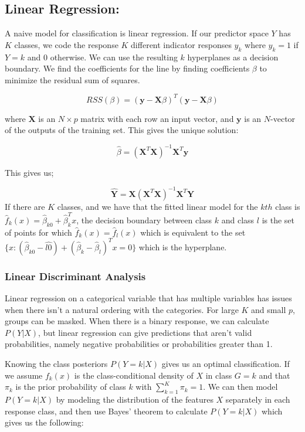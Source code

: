\documentclass[12pt,twoside]{reedthesis}
\theoremstyle{definition}
\theoremstyle{definition}
\theoremstyle{definition}
\theoremstyle{remark}
\begin{document}
\subsection{Linear Regression:}\label{linear-regression}

A naive model for classification is linear regression. If our predictor
space \(Y\) has \(K\) classes, we code the response \(K\) different
indicator responses \(y_k\) where \(y_k = 1\) if \(Y = k\) and 0
otherwise. We can use the resulting \(k\) hyperplanes as a decision
boundary. We find the coefficients for the line by finding coefficients
\(\beta\) to minimize the residual sum of squares.

\[ RSS(\beta) = (\textbf{y} - \textbf{X}\beta)^T(\textbf{y} - \textbf{X}\beta) \]

where \(\textbf{X}\) is an \(N\times p\) matrix with each row an input
vector, and \(\textbf{y}\) is an \(N\)-vector of the outputs of the
training set. This gives the unique solution:

\[ \hat{\beta} = (\textbf{X}^T\textbf{X})^{-1}\textbf{X}^T\textbf{y}\]

This gives us;

\[\hat{\textbf{Y}} = \textbf{X}(\textbf{X}^T\textbf{X})^{-1}\textbf{X}^T
\textbf{Y}\] If there are \(K\) classes, and we have that the fitted
linear model for the \(kth\) class is
\(\hat{f}_k(x) = \hat{\beta}_{k0} + \hat{\beta}^T_kx\), the decision
boundary between class \(k\) and class \(l\) is the set of points for
which \(\hat{f}_k(x) = \hat{f}_l(x)\) which is equivalent to the set
\(\{x: (\hat{\beta}_{k0} - \hat{l0}) + (\hat{\beta}_k - \hat{\beta}_l)^Tx = 0\}\)
which is the hyperplane.

\subsubsection{Linear Discriminant
Analysis}\label{linear-discriminant-analysis}

Linear regression on a categorical variable that has multiple variables
has issues when there isn't a natural ordering with the categories. For
large \(K\) and small \(p\), groups can be masked. When there is a
binary response, we can calculate \(P(Y|X)\), but linear regression can
give predictions that aren't valid probabilities, namely negative
probabilities or probabilities greater than 1.

Knowing the class posteriors \(P(Y = k|X)\) gives us an optimal
classification. If we assume \(f_k(x)\) is the class-conditional density
of \(X\) in class \(G = k\) and that \(\pi_k\) is the prior probability
of class \(k\) with \(\sum_{k=1}^K \pi_k = 1\). We can then model
\(P(Y = k | X)\) by modeling the distribution of the features \(X\)
separately in each response class, and then use Bayes' theorem to
calculate \(P(Y = k |X)\) which gives us the following:
\end{document}
